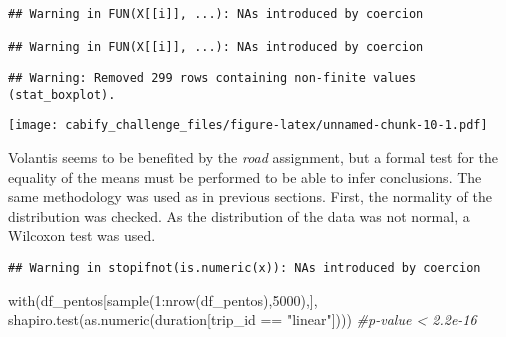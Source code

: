 \documentclass[
]{article}
\newenvironment{Shaded}{\begin{snugshade}}{\end{snugshade}}
\newcommand{\CommentTok}[1]{\textcolor[rgb]{0.56,0.35,0.01}{\textit{#1}}}
\newcommand{\DecValTok}[1]{\textcolor[rgb]{0.00,0.00,0.81}{#1}}
\newcommand{\FunctionTok}[1]{\textcolor[rgb]{0.00,0.00,0.00}{#1}}
\newcommand{\NormalTok}[1]{#1}
\newcommand{\OtherTok}[1]{\textcolor[rgb]{0.56,0.35,0.01}{#1}}
\newcommand{\SpecialCharTok}[1]{\textcolor[rgb]{0.00,0.00,0.00}{#1}}
\newcommand{\StringTok}[1]{\textcolor[rgb]{0.31,0.60,0.02}{#1}}
\begin{document}
\begin{verbatim}
## Warning in FUN(X[[i]], ...): NAs introduced by coercion

## Warning in FUN(X[[i]], ...): NAs introduced by coercion
\end{verbatim}

\begin{verbatim}
## Warning: Removed 299 rows containing non-finite values (stat_boxplot).
\end{verbatim}

\texttt{[image: cabify\_challenge\_files/figure-latex/unnamed-chunk-10-1.pdf]}

Volantis seems to be benefited by the \emph{road} assignment, but a
formal test for the equality of the means must be performed to be able
to infer conclusions. The same methodology was used as in previous
sections. First, the normality of the distribution was checked. As the
distribution of the data was not normal, a Wilcoxon test was used.

\begin{Shaded}
\end{Shaded}

\begin{verbatim}
## Warning in stopifnot(is.numeric(x)): NAs introduced by coercion
\end{verbatim}

\begin{Shaded}
\begin{Highlighting}[]
\FunctionTok{with}\NormalTok{(df\_pentos[}\FunctionTok{sample}\NormalTok{(}\DecValTok{1}\SpecialCharTok{:}\FunctionTok{nrow}\NormalTok{(df\_pentos),}\DecValTok{5000}\NormalTok{),], }
     \FunctionTok{shapiro.test}\NormalTok{(}\FunctionTok{as.numeric}\NormalTok{(duration[trip\_id }\SpecialCharTok{==} \StringTok{"linear"}\NormalTok{]))) }\CommentTok{\#p{-}value \textless{} 2.2e{-}16}
\end{Highlighting}
\end{Shaded}
\end{document}
